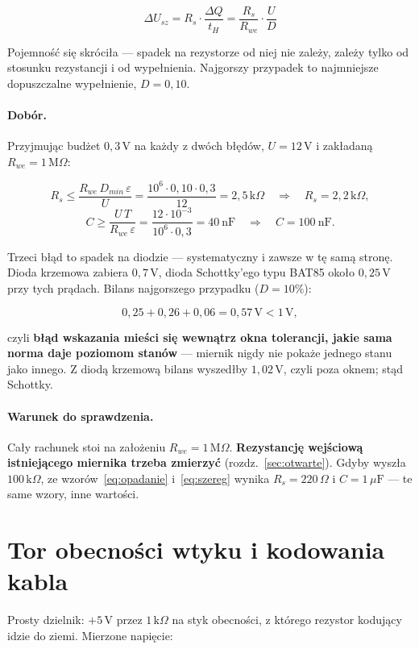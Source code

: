 \documentclass[a4paper,11pt]{article}
\newcommand{\ohm}{\,\Omega}
\newcommand{\kohm}{\,\mathrm{k}\Omega}
\newcommand{\Mohm}{\,\mathrm{M}\Omega}
\newcommand{\volt}{\,\mathrm{V}}
\begin{document}
\begin{equation}
\Delta U_{sz}=R_s\cdot\frac{\Delta Q}{t_H}=\frac{R_s}{R_{we}}\cdot\frac{U}{D}
\label{eq:szereg}
\end{equation}

Pojemność się skróciła --- spadek na rezystorze od niej nie zależy, zależy tylko od
stosunku rezystancji i od wypełnienia. Najgorszy przypadek to najmniejsze
dopuszczalne wypełnienie, $D=0{,}10$.

\paragraph{Dobór.} Przyjmując budżet $0{,}3\volt$ na każdy z dwóch błędów,
$U=12\volt$ i zakładaną $R_{we}=1\Mohm$:

\[
R_s \le \frac{R_{we}\,D_{min}\,\varepsilon}{U}
     = \frac{10^6\cdot0{,}10\cdot0{,}3}{12}=2{,}5\kohm
\quad\Rightarrow\quad R_s = 2{,}2\kohm,
\]
\[
C \ge \frac{U\,T}{R_{we}\,\varepsilon}
   = \frac{12\cdot10^{-3}}{10^{6}\cdot0{,}3}=40\ \mathrm{nF}
\quad\Rightarrow\quad C = 100\ \mathrm{nF}.
\]

Trzeci błąd to spadek na diodzie --- systematyczny i zawsze w tę samą stronę.
Dioda krzemowa zabiera $0{,}7\volt$, dioda Schottky'ego typu BAT85 około
$0{,}25\volt$ przy tych prądach. Bilans najgorszego przypadku ($D=10\%$):

\[
0{,}25 + 0{,}26 + 0{,}06 = 0{,}57\volt < 1\volt ,
\]

czyli \textbf{błąd wskazania mieści się wewnątrz okna tolerancji, jakie sama norma
daje poziomom stanów} --- miernik nigdy nie pokaże jednego stanu jako innego.
Z diodą krzemową bilans wyszedłby $1{,}02\volt$, czyli poza oknem; stąd Schottky.

\paragraph{Warunek do sprawdzenia.} Cały rachunek stoi na założeniu
$R_{we}=1\Mohm$. \textbf{Rezystancję wejściową istniejącego miernika trzeba
zmierzyć} (rozdz.~\ref{sec:otwarte}). Gdyby wyszła $100\kohm$, ze
wzorów~\eqref{eq:opadanie} i~\eqref{eq:szereg} wynika $R_s=220\ohm$
i $C=1\,\mu\mathrm{F}$ --- te same wzory, inne wartości.

\section{Tor obecności wtyku i kodowania kabla}
\label{sec:pp}

Prosty dzielnik: $+5\volt$ przez $1\kohm$ na styk obecności, z którego rezystor
kodujący idzie do ziemi. Mierzone napięcie:
\end{document}
